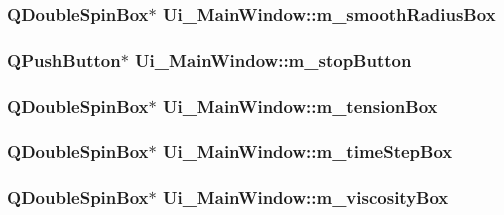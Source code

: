 \label{classUi__MainWindow_a223abe14980fe1049e3bbdf0ed376a0a}
\hypertarget{classUi__MainWindow_a8941af0576a2bbc18b2eb4812a0cb957}{
\subsubsection[{m\_\-smoothRadiusBox}]{\setlength{\rightskip}{0pt plus 5cm}QDoubleSpinBox$\ast$ {\bf Ui\_\-MainWindow::m\_\-smoothRadiusBox}}}
\label{classUi__MainWindow_a8941af0576a2bbc18b2eb4812a0cb957}
\hypertarget{classUi__MainWindow_af0a56879050b5b59965ddb9cc20ad9cc}{
\subsubsection[{m\_\-stopButton}]{\setlength{\rightskip}{0pt plus 5cm}QPushButton$\ast$ {\bf Ui\_\-MainWindow::m\_\-stopButton}}}
\label{classUi__MainWindow_af0a56879050b5b59965ddb9cc20ad9cc}
\hypertarget{classUi__MainWindow_aed189246fd8fbb26a2ece932b8c03615}{
\subsubsection[{m\_\-tensionBox}]{\setlength{\rightskip}{0pt plus 5cm}QDoubleSpinBox$\ast$ {\bf Ui\_\-MainWindow::m\_\-tensionBox}}}
\label{classUi__MainWindow_aed189246fd8fbb26a2ece932b8c03615}
\hypertarget{classUi__MainWindow_abc208bcf25fb6e90d8952694211f109a}{
\subsubsection[{m\_\-timeStepBox}]{\setlength{\rightskip}{0pt plus 5cm}QDoubleSpinBox$\ast$ {\bf Ui\_\-MainWindow::m\_\-timeStepBox}}}
\label{classUi__MainWindow_abc208bcf25fb6e90d8952694211f109a}
\hypertarget{classUi__MainWindow_aed67342868bc3330ef288206a46c2e9f}{
\subsubsection[{m\_\-viscosityBox}]{\setlength{\rightskip}{0pt plus 5cm}QDoubleSpinBox$\ast$ {\bf Ui\_\-MainWindow::m\_\-viscosityBox}}}
